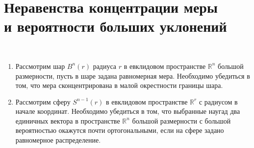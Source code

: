 \section{Неравенства концентрации меры \\ и вероятности больших уклонений}
\label{measure}


\begin{problem}
\
\begin{enumerate}
\item Рассмотрим шар $B^{n}(r)$ радиуса $r$ в евклидовом пространстве $\mathbb{R}^n$ большой размерности, пусть в шаре задана равномерная мера. 
 Необходимо убедиться в том, что мера сконцентрирована в малой окрестности  границы шара.
\item
Рассмотрим сферу $S^{n-1}(r)$ в евклидовом пространстве $\mathbb{R}^r$ с радиусом в начале координат. Необходимо убедиться в том, что выбранные наугад два единичных вектора в пространстве $\mathbb{R}^n$ большой размерности с большой вероятностью окажутся почти ортогональными, если на сфере задано равномерное распределение.  
\end{enumerate}
\end{problem}


